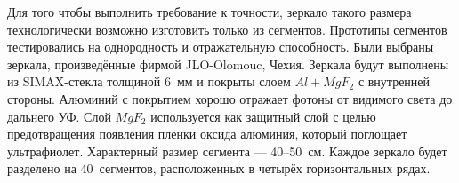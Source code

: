 Для того чтобы выполнить требование к точности, зеркало такого размера технологически возможно изготовить только из сегментов. Прототипы сегментов тестировались на однородность и отражательную способность. Были выбраны зеркала, произведённые фирмой \mbox{JLO-Olomouc}, Чехия. Зеркала будут выполнены из SIMAX-стекла толщиной 6~мм и покрыты слоем $Al+MgF_{2}$ с внутренней стороны. Алюминий с покрытием хорошо отражает фотоны от видимого света до дальнего УФ. Слой $MgF_{2}$ используется как защитный слой с целью предотвращения появления пленки оксида алюминия, который поглощает ультрафиолет. Характерный размер сегмента --- 40--50~см. Каждое зеркало будет разделено на 40~сегментов, расположенных в четырёх горизонтальных рядах.







